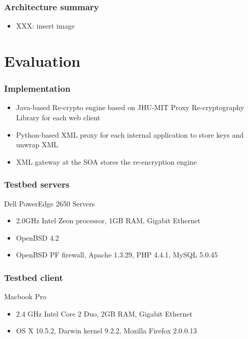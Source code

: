 \documentclass{beamer}
\begin{document}
\begin{frame}
\frametitle{Architecture summary}
\begin{itemize}
\item XXX: insert image
\end{itemize}
\end{frame}

\section{Evaluation}
\begin{frame}
\frametitle{Implementation}
\begin{itemize}
\item Java-based Re-crypto engine based on JHU-MIT Proxy Re-cryptography
Library for each web client
\item Python-based XML proxy for each internal application to store keys and
unwrap XML
\item XML gateway at the SOA stores the re-encryption engine 
\end{itemize}
\end{frame}

\begin{frame}
\frametitle{Testbed servers}
Dell PowerEdge 2650 Servers
\begin{itemize}
\item 2.0GHz Intel Zeon processor, 1GB RAM, Gigabit Ethernet
\item OpenBSD 4.2
\item OpenBSD PF firewall, Apache 1.3.29, PHP 4.4.1, MySQL 5.0.45 
\end{itemize}
\end{frame}

\begin{frame}
\frametitle{Testbed client}
Macbook Pro
\begin{itemize}
\item 2.4 GHz Intel Core 2 Duo, 2GB RAM, Gigabit Ethernet
\item OS X 10.5.2, Darwin kernel 9.2.2, Mozilla Firefox 2.0.0.13
\end{itemize}
\end{frame}
\end{document}
